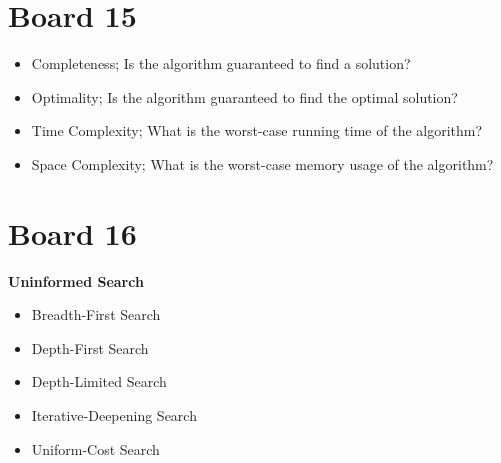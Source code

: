 \documentclass[10pt]{article}
\begin{document}
\section{Board 15}


\begin{itemize}
\item Completeness; Is the algorithm guaranteed to find a solution?
\item Optimality; Is the algorithm guaranteed to find the optimal solution?
\item Time Complexity; What is the worst-case running time of the algorithm?
\item Space Complexity; What is the worst-case memory usage of the algorithm?
\end{itemize}

\section{Board 16}

\textbf{Uninformed Search}

\begin{itemize}
\item Breadth-First Search
\item Depth-First Search
\item Depth-Limited Search
\item Iterative-Deepening Search
\item Uniform-Cost Search
\end{itemize}


\end{document}
